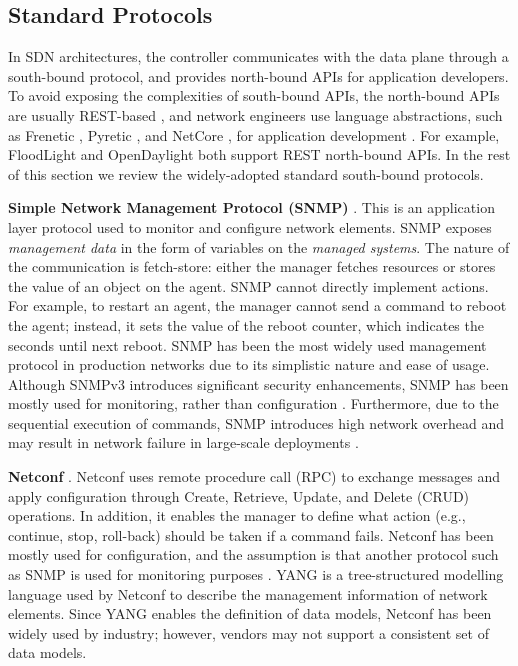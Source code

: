 \subsection{Standard Protocols}
\label{Protocols}
In SDN architectures, the controller communicates with the data plane through a south-bound protocol, and provides north-bound APIs for application developers.
To avoid exposing the complexities of south-bound APIs, the north-bound APIs are usually REST-based \cite{zhou2014rest,richardson2008restful}, and network engineers use language abstractions, such as Frenetic \cite{foster2011frenetic}, Pyretic \cite{reich2013modular}, and NetCore \cite{monsanto2012compiler}, for application development \cite{SDNLang}.
For example, FloodLight \cite{Floodlight} and OpenDaylight \cite{medved2014opendaylight} both support REST north-bound APIs. 
In the rest of this section we review the widely-adopted standard south-bound protocols.


\textbf{Simple Network Management Protocol (SNMP)} \cite{case1990simple,SNMP,harrington2002rfc,stallings1998snmp}. 
This is an application layer protocol used to monitor and configure network elements.
SNMP exposes \textit{management data} in the form of variables on the \textit{managed systems}. 
The nature of the communication is fetch-store: either the manager fetches resources or stores the value of an object on the agent.
SNMP cannot directly implement actions. For example, to restart an agent, the manager cannot send a command to reboot the agent; instead, it sets the value of the reboot counter, which indicates the seconds  until next reboot.
SNMP  has  been  the  most widely used management protocol in production networks due to  its  simplistic  nature  and  ease  of  usage.
Although SNMPv3 introduces significant security enhancements, SNMP has been mostly used for monitoring, rather than configuration \cite{clemm2006network}.
Furthermore, due to the sequential execution of commands, SNMP introduces high network overhead and may result in network failure in large-scale deployments \cite{kona2002framework,silva2005defining}.


\textbf{Netconf} \cite{enns2011network}. 
Netconf uses remote procedure call (RPC) to exchange messages and apply configuration through Create, Retrieve, Update, and Delete (CRUD) operations.
In addition, it enables the manager to define what action (e.g., continue, stop, roll-back) should be taken if a command fails.
Netconf has been mostly used for configuration, and the assumption is that another protocol such as SNMP is used for monitoring purposes \cite{clemm2006network}.
YANG is a tree-structured  modelling  language used by Netconf to  describe  the  management  information of network elements.
Since YANG enables the definition of data models, Netconf has been widely used by industry; however, vendors may not support a consistent set of data models.


